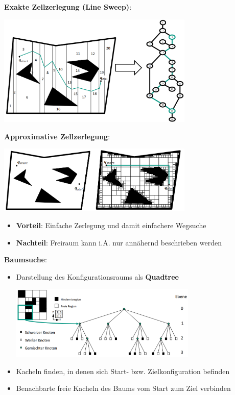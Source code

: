 \textbf{Exakte Zellzerlegung (Line Sweep)}:
\begin{center}
	\includegraphics[width=0.7\textwidth]{images/e-zz.png}
\end{center}
\pagebreak

\textbf{Approximative Zellzerlegung}:
\begin{center}
	\includegraphics[width=0.7\textwidth]{images/a-zz.png}
\end{center}
\begin{itemize}
	\item \textbf{Vorteil}: Einfache Zerlegung und damit einfachere Wegsuche
	\item \textbf{Nachteil}: Freiraum kann i.A. nur annähernd beschrieben werden
\end{itemize}
\bigskip
\textbf{Baumsuche}:
\begin{itemize}
	\item Darstellung des Konfigurationsraums als \textbf{Quadtree}
	\begin{center}
		\includegraphics[width=0.7\textwidth]{images/quadtree.png}
	\end{center}
	\item Kacheln finden, in denen sich Start- bzw. Zielkonfiguration befinden
	\item Benachbarte freie Kacheln des Baums vom Start zum Ziel verbinden
\end{itemize}
